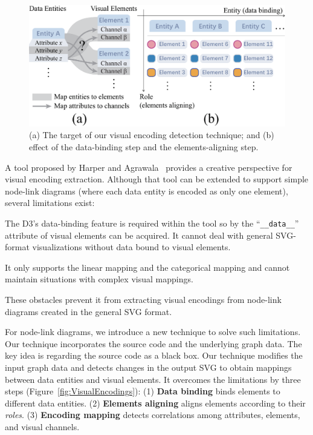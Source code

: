 \begin{figure}[ht]
    \centering
    \includegraphics[width=1\columnwidth]{figures/ElementAligning.eps}
    \caption{(a) The target of our visual encoding detection technique; and (b) effect of the data-binding step and the elements-aligning step.}
    \label{fig:ElementAligning}
\end{figure}

A tool proposed by Harper and Agrawala~\cite{DBLP:conf/uist/HarperA14} provides a creative perspective for visual encoding extraction.
Although that tool can be extended to support simple node-link diagrams (where each data entity is encoded as only one element), several limitations exist:
\begin{compactenum}
\item The D3's data-binding feature is required within the tool so by the ``\texttt{\_\_data\_\_}'' attribute of visual elements can be acquired. 
It cannot deal with general SVG-format visualizations without data bound to visual elements.

\item It only supports the linear mapping and the categorical mapping and cannot maintain situations with complex visual mappings.
\end{compactenum}
These obstacles prevent it from extracting visual encodings from node-link diagrams created in the general SVG format.

For node-link diagrams, we introduce a new technique to solve such limitations.
Our technique incorporates the source code and the underlying graph data.
The key idea is regarding the source code as a black box.
Our technique modifies the input graph data and detects changes in the output SVG to obtain mappings between data entities and visual elements.
It overcomes the limitations by three steps (Figure~\ref{fig:VisualEncodings}):
(1) \textbf{Data binding} binds elements to different data entities.
(2) \textbf{Elements aligning} aligns elements according to their \textit{roles}. 
(3) \textbf{Encoding mapping} detects correlations among attributes, elements, and visual channels.

